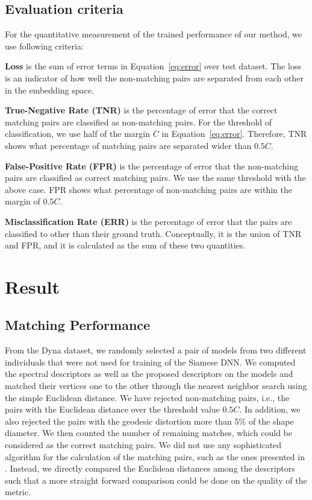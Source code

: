 \documentclass[5p,twocolumn,10pt,times]{elsarticle}
\begin{document}
\subsection{Evaluation criteria}
\label{sec:evalcrit}

For the quantitative measurement of the trained performance of our method, we use following criteria:

\textbf{Loss} is the sum of error terms in Equation~\ref{eq:error} over test dataset. The loss is an indicator of how well the non-matching pairs are separated from each other in the embedding space.

\textbf{True-Negative Rate (TNR)} is the percentage of error that the correct matching pairs are classified as non-matching pairs. For the threshold of classification, we use half of the margin $C$ in Equation~\ref{eq:error}. Therefore, TNR shows what percentage of matching pairs are separated wider than $0.5 C$.

\textbf{False-Positive Rate (FPR)} is the percentage of error that the non-matching pairs are classified as correct matching pairs. We use the same threshold with the above case. FPR shows what percentage of non-matching pairs are within the margin of $0.5C$.

\textbf{Misclassification Rate (ERR)} is the percentage of error that the pairs are classified to other than their ground truth. Conceptually, it is the union of TNR and FPR, and it is calculated as the sum of these two quantities.

\section{Result}
\label{sec:result}

\subsection{Matching Performance}
\label{sec:3}
From the Dyna dataset, we randomly selected a pair of models from two different individuals that were not used for training of the Siamese DNN. We computed the spectral descriptors as well as the proposed descriptors on the models and matched their vertices one to the other through the nearest neighbor search using the simple Euclidean distance. We have rejected non-matching pairs, i.e., the pairs with the Euclidean distance over the threshold value $0.5C$. In addition, we also rejected the pairs with the geodesic distortion more than 5\% of the shape diameter. We then counted the number of remaining matches, which could be considered as the correct matching pairs. We did not use any sophisticated algorithm for the calculation of the matching pairs, such as the ones presented in \cite{litman2014learning,leordeanu2005spectral}. Instead, we directly compared the Euclidean distances among the descriptors such that a more straight forward comparison could be done on the quality of the metric.
\end{document}
